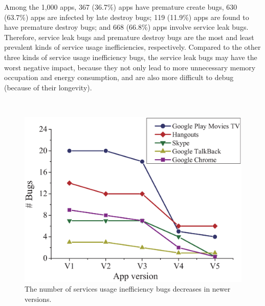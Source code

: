 \documentclass[sigconf,review, anonymous]{acmart}
\begin{document}
Among the 1,000 apps, 367 (36.7\%) apps have premature create bugs, 630 (63.7\%)
apps are infected by late destroy bugs; 119 (11.9\%) apps are found to have
premature destroy bugs; and 668 (66.8\%) apps involve service leak bugs.
Therefore, service leak bugs and premature destroy bugs are the most and least
prevalent kinds of service usage inefficiencies, respectively. Compared to the
other three kinds of service usage inefficiency bugs, the service leak
bugs may have the worst negative impact, because they not only lead to
more unnecessary memory occupation and energy consumption, and are also more
difficult to debug (because of their longevity).



\medskip
{\setlength{\parindent}{0 em}
}\\
\medskip


 \begin{figure}[!h]
 \centering
  \includegraphics[scale=0.35]{bugs-vs-versions.eps}
 \caption{The number of services usage inefficiency bugs decreases in newer versions.}
\label{fig_bugsvsversions}
\end{figure}
\end{document}
